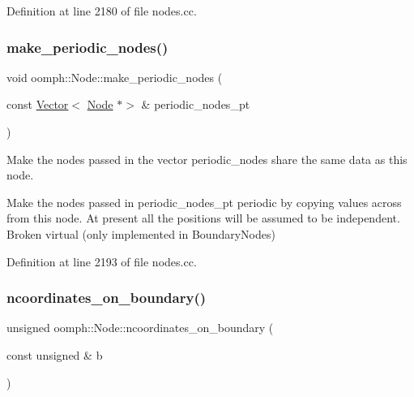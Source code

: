 Definition at line 2180 of file nodes.\+cc.

\mbox{\label{classoomph_1_1Node_a320035237f144eacb53567e89ea91b94}} 
\subsubsection{\texorpdfstring{make\+\_\+periodic\+\_\+nodes()}{make\_periodic\_nodes()}}
{\footnotesize\ttfamily void oomph\+::\+Node\+::make\+\_\+periodic\+\_\+nodes (\begin{DoxyParamCaption}\item[{const \hyperlink{classoomph_1_1Vector}{Vector}$<$ \hyperlink{classoomph_1_1Node}{Node} $\ast$$>$ \&}]{periodic\+\_\+nodes\+\_\+pt }\end{DoxyParamCaption})\hspace{0.3cm}{\ttfamily [virtual]}}



Make the nodes passed in the vector periodic\+\_\+nodes share the same data as this node. 

Make the nodes passed in periodic\+\_\+nodes\+\_\+pt periodic by copying values across from this node. At present all the positions will be assumed to be independent. Broken virtual (only implemented in Boundary\+Nodes) 

Definition at line 2193 of file nodes.\+cc.

\mbox{\label{classoomph_1_1Node_a245b0e182ca0877bda9bbcb978807273}} 
\subsubsection{\texorpdfstring{ncoordinates\+\_\+on\+\_\+boundary()}{ncoordinates\_on\_boundary()}}
{\footnotesize\ttfamily unsigned oomph\+::\+Node\+::ncoordinates\+\_\+on\+\_\+boundary (\begin{DoxyParamCaption}\item[{const unsigned \&}]{b }\end{DoxyParamCaption})\hspace{0.3cm}{\ttfamily [virtual]}}



